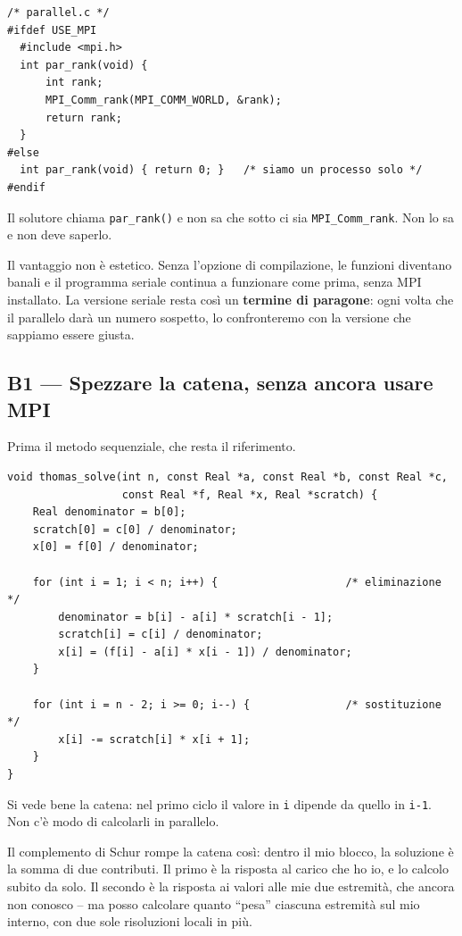 \documentclass[11pt,a4paper]{article}
\newcommand{\cd}[1]{\texttt{\small #1}}
\begin{document}
\begin{lstlisting}
/* parallel.c */
#ifdef USE_MPI
  #include <mpi.h>
  int par_rank(void) {
      int rank;
      MPI_Comm_rank(MPI_COMM_WORLD, &rank);
      return rank;
  }
#else
  int par_rank(void) { return 0; }   /* siamo un processo solo */
#endif
\end{lstlisting}

Il solutore chiama \cd{par\_rank()} e non sa che sotto ci sia
\cd{MPI\_Comm\_rank}. Non lo sa e non deve saperlo.

Il vantaggio non è estetico. Senza l'opzione di compilazione, le funzioni
diventano banali e il programma seriale continua a funzionare come prima, senza
MPI installato. La versione seriale resta così un \textbf{termine di paragone}:
ogni volta che il parallelo darà un numero sospetto, lo confronteremo con la
versione che sappiamo essere giusta.

\subsection*{B1 --- Spezzare la catena, senza ancora usare MPI}

Prima il metodo sequenziale, che resta il riferimento.

\begin{lstlisting}
void thomas_solve(int n, const Real *a, const Real *b, const Real *c,
                  const Real *f, Real *x, Real *scratch) {
    Real denominator = b[0];
    scratch[0] = c[0] / denominator;
    x[0] = f[0] / denominator;

    for (int i = 1; i < n; i++) {                    /* eliminazione */
        denominator = b[i] - a[i] * scratch[i - 1];
        scratch[i] = c[i] / denominator;
        x[i] = (f[i] - a[i] * x[i - 1]) / denominator;
    }

    for (int i = n - 2; i >= 0; i--) {               /* sostituzione */
        x[i] -= scratch[i] * x[i + 1];
    }
}
\end{lstlisting}

Si vede bene la catena: nel primo ciclo il valore in \cd{i} dipende da quello in
\cd{i-1}. Non c'è modo di calcolarli in parallelo.

\medskip
Il complemento di Schur rompe la catena così: dentro il mio blocco, la soluzione
è la somma di due contributi. Il primo è la risposta al carico che ho io, e lo
calcolo subito da solo. Il secondo è la risposta ai valori alle mie due
estremità, che ancora non conosco -- ma posso calcolare quanto ``pesa'' ciascuna
estremità sul mio interno, con due sole risoluzioni locali in più.
\end{document}
